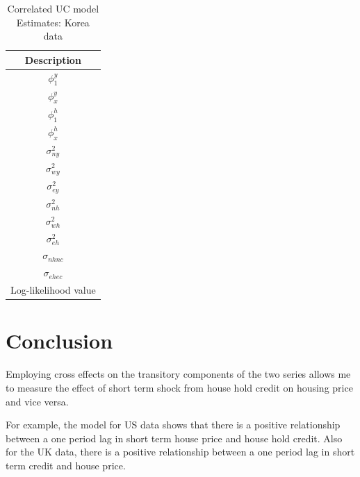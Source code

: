 \documentclass[fleqn]{article}
\begin{document}
\begin{outline}[enumerate]
\begin{table}
	\begin{center}
		\caption{Correlated UC model Estimates: Korea data}
		\begin{tabular}{c}
			\toprule
			Description\\
			\midrule
			$\phi^y_{1}$ \\
			$\phi^y_{x}$ \\		
			$\phi^h_{1}$ \\
			$\phi^h_{x}$ \\
			$\sigma^2_{ny}$\\
			$\sigma^2_{wy}$\\
			$\sigma^2_{ey}$\\
			$\sigma^2_{nh}$\\
			$\sigma^2_{wh}$\\
			$\sigma^2_{eh}$\\
			$\sigma_{nhnc}$\\
			$\sigma_{ehec}$\\
			Log-likelihood value\\
			\bottomrule
		\end{tabular}%
	\end{center}
\end{table}

\clearpage
\section{Conclusion}
Employing cross effects on the transitory components of the two series allows me to measure the effect of short term shock from house hold credit on housing price and vice versa.  

For example, the model for US data shows that there is a positive relationship between a one period lag in short term house price and house hold credit. Also for the UK data, there is a positive relationship between a one period lag in short term credit and house price.


\end{outline}
\end{document}
